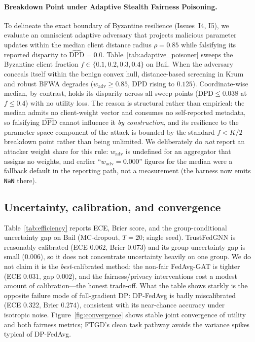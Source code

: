 \documentclass[pdflatex,sn-mathphys-num]{sn-jnl}
\theoremstyle{thmstyleone}%
\theoremstyle{thmstyletwo}%
\theoremstyle{thmstylethree}%
\begin{document}
\paragraph{Breakdown Point under Adaptive Stealth Fairness Poisoning.}
To delineate the exact boundary of Byzantine resilience (Issues~I4, I5), we evaluate an omniscient adaptive adversary that projects malicious parameter updates within the median client distance radius $\rho=0.85$ while falsifying its reported disparity to $\widehat{\mathrm{DPD}}=0.0$. Table~\ref{tab:adaptive_poisoner} sweeps the Byzantine client fraction $f \in \{0.1, 0.2, 0.3, 0.4\}$ on Bail. When the adversary conceals itself within the benign convex hull, distance-based screening in Krum and robust BFWA degrades ($w_{\text{adv}} \ge 0.85$, DPD rising to $0.125$). Coordinate-wise median, by contrast, holds its disparity across all sweep points ($\mathrm{DPD} \le 0.038$ at $f \le 0.4$) with no utility loss. The reason is structural rather than empirical: the median admits no client-weight vector and consumes no self-reported metadata, so falsifying $\widehat{\mathrm{DPD}}$ cannot influence it \emph{by construction}, and its resilience to the parameter-space component of the attack is bounded by the standard $f < K/2$ breakdown point rather than being unlimited. We deliberately do \emph{not} report an attacker weight share for this rule: $w_{\text{adv}}$ is undefined for an aggregator that assigns no weights, and earlier ``$w_{\text{adv}}=0.000$'' figures for the median were a fallback default in the reporting path, not a measurement (the harness now emits \texttt{NaN} there).



\subsection{Uncertainty, calibration, and convergence}
Table~\ref{tab:efficiency} reports ECE, Brier score, and the group-conditional
uncertainty gap on Bail (MC-dropout, $T{=}20$; single seed). TrustFedGNN is
reasonably calibrated (ECE $0.062$, Brier $0.073$) and its group uncertainty gap
is small ($0.006$), so it does not concentrate uncertainty heavily on one group.
We do not claim it is the \emph{best}-calibrated method: the non-fair FedAvg-GAT
is tighter (ECE $0.031$, gap $0.002$), and the fairness/privacy interventions
cost a modest amount of calibration---the honest trade-off. What the table shows
starkly is the opposite failure mode of full-gradient DP: DP-FedAvg is badly
miscalibrated (ECE $0.322$, Brier $0.274$), consistent with its near-chance
accuracy under isotropic noise. Figure~\ref{fig:convergence} shows stable joint
convergence of utility and both fairness metrics; FTGD's clean task pathway
avoids the variance spikes typical of DP-FedAvg.
\end{document}
